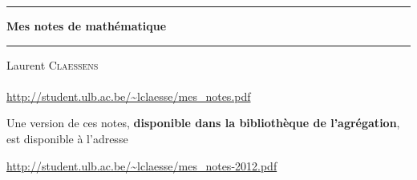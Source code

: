 
\thispagestyle{empty}
\begin{center}
  \begin{minipage}{15cm}
    \hrule\par
    \vspace{2mm}
    \begin{center}
    \Huge \bfseries Mes notes de mathématique \par
    \end{center}
    \hrule\par
  \end{minipage}
\end{center}

\vspace{2cm}

\begin{center}
    Laurent \textsc{Claessens}\\
    \\
    \url{http://student.ulb.ac.be/~lclaesse/mes_notes.pdf}

    \vspace{1cm}

    Une version de ces notes, {\bf disponible dans la bibliothèque de l'agrégation}, est disponible à l'adresse

    \url{http://student.ulb.ac.be/~lclaesse/mes_notes-2012.pdf}
\end{center}

\vfill

